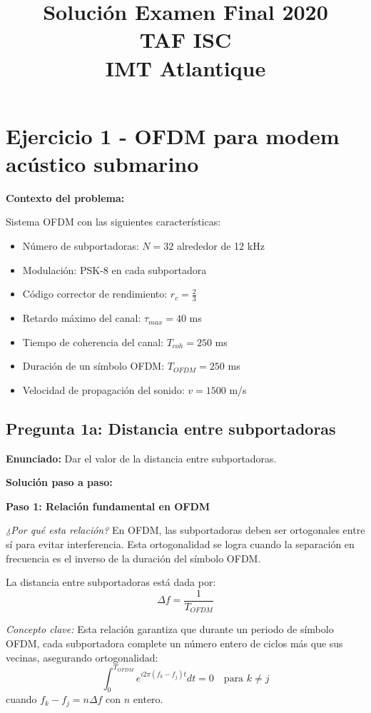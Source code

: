 \documentclass[11pt,a4paper]{article}
\title{\textbf{Solución Examen Final 2020\\TAF ISC\\IMT Atlantique}}
\author{}
\date{}
\begin{document}
\maketitle

\section*{Ejercicio 1 - OFDM para modem acústico submarino}

\textbf{Contexto del problema:}

Sistema OFDM con las siguientes características:
\begin{itemize}
    \item Número de subportadoras: $N = 32$ alrededor de 12 kHz
    \item Modulación: PSK-8 en cada subportadora
    \item Código corrector de rendimiento: $r_c = \frac{2}{3}$
    \item Retardo máximo del canal: $\tau_{max} = 40$ ms
    \item Tiempo de coherencia del canal: $T_{coh} = 250$ ms
    \item Duración de un símbolo OFDM: $T_{OFDM} = 250$ ms
    \item Velocidad de propagación del sonido: $v = 1500$ m/s
\end{itemize}

\subsection*{Pregunta 1a: Distancia entre subportadoras}

\textbf{Enunciado:} Dar el valor de la distancia entre subportadoras.

\vspace{0.3cm}
\textbf{Solución paso a paso:}

\textbf{Paso 1: Relación fundamental en OFDM}

\textit{¿Por qué esta relación?} En OFDM, las subportadoras deben ser ortogonales entre sí para evitar interferencia. Esta ortogonalidad se logra cuando la separación en frecuencia es el inverso de la duración del símbolo OFDM.

La distancia entre subportadoras está dada por:
\[
\Delta f = \frac{1}{T_{OFDM}}
\]

\textit{Concepto clave:} Esta relación garantiza que durante un periodo de símbolo OFDM, cada subportadora complete un número entero de ciclos más que sus vecinas, asegurando ortogonalidad:
\[
\int_0^{T_{OFDM}} e^{i2\pi(f_k - f_j)t} dt = 0 \quad \text{para } k \neq j
\]
cuando $f_k - f_j = n\Delta f$ con $n$ entero.
\end{document}

